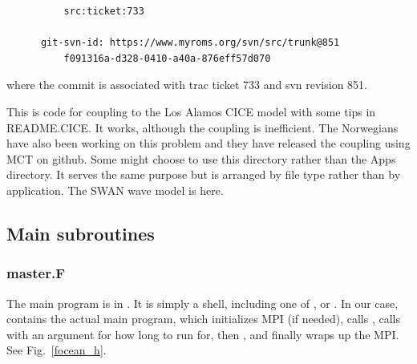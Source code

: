 \begin{klist}
\begin{klist}
\begin{verbatim}
          src:ticket:733
	      
	  git-svn-id: https://www.myroms.org/svn/src/trunk@851
		  f091316a-d328-0410-a40a-876eff57d070
    \end{verbatim}
    where the commit is associated with trac ticket 733 and svn revision 851.
\end{klist}
   This is code for coupling to the Los Alamos CICE model
    with some tips in README.CICE. It works, although the coupling is
    inefficient. The Norwegians have also been working on this problem
    and they have released the  coupling using MCT on github.
   Some might choose to use this directory rather than
    the Apps directory. It serves the same purpose but is arranged
    by file type rather than by application.
   The SWAN wave model is here.
\end{klist}

\subsection{Main subroutines}
\label{Master}

\subsubsection{master.F}
The main program is in . It is simply a shell, including
one of ,  or . In
our case,  contains the actual main program, which
initializes MPI (if needed), calls ,
calls  with an argument for how long to run for,
then , and finally wraps up the MPI.
See Fig.\ \ref{focean_h}.

